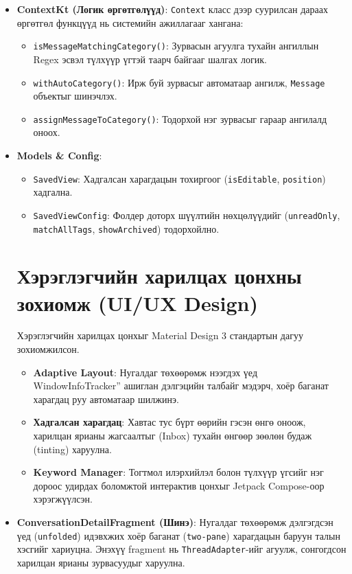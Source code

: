 \begin{itemize}
\begin{itemize}
        \item \textbf{ContextKt (Логик өргөтгөлүүд)}: \texttt{Context} класс дээр суурилсан дараах өргөтгөл функцүүд нь системийн ажиллагааг хангана:
        \begin{itemize}
            \item \texttt{isMessageMatchingCategory()}: Зурвасын агуулга тухайн ангиллын Regex эсвэл түлхүүр үгтэй таарч байгааг шалгах логик.
            \item \texttt{withAutoCategory()}: Ирж буй зурвасыг автоматаар ангилж, \texttt{Message} объектыг шинэчлэх.
            \item \texttt{assignMessageToCategory()}: Тодорхой нэг зурвасыг гараар ангилалд оноох.
        \end{itemize}
    \item \textbf{Models \& Config}:
    \begin{itemize}
        \item \texttt{SavedView}: Хадгалсан харагдацын тохиргоог (\texttt{isEditable}, \texttt{position}) хадгална.
        \item \texttt{SavedViewConfig}: Фолдер доторх шүүлтийн нөхцөлүүдийг (\texttt{unreadOnly}, \texttt{matchAllTags}, \texttt{showArchived}) тодорхойлно.
    \end{itemize}
\section{Хэрэглэгчийн харилцах цонхны зохиомж (UI/UX Design)}
Хэрэглэгчийн харилцах цонхыг Material Design 3 стандартын \cite{material_design} дагуу зохиомжилсон.
\begin{itemize}
    \item \textbf{Adaptive Layout}: Нугалдаг төхөөрөмж нээгдэх үед WindowInfoTracker'' ашиглан дэлгэцийн талбайг мэдэрч, хоёр баганат харагдац руу автоматаар шилжинэ.
    \item \textbf{Хадгалсан харагдац}: Хавтас тус бүрт өөрийн гэсэн өнгө оноож, харилцан ярианы жагсаалтыг (Inbox) тухайн өнгөөр зөөлөн будаж (tinting) харуулна.
    \item \textbf{Keyword Manager}: Тогтмол илэрхийлэл болон түлхүүр үгсийг нэг дороос удирдах боломжтой интерактив цонхыг Jetpack Compose-оор хэрэгжүүлсэн.
\end{itemize}
        \item \textbf{ConversationDetailFragment (Шинэ)}: Нугалдаг төхөөрөмж дэлгэгдсэн үед (\texttt{unfolded}) идэвхжих хоёр баганат (\texttt{two-pane}) харагдацын баруун талын хэсгийг хариуцна. Энэхүү fragment нь \texttt{ThreadAdapter}-ийг агуулж, сонгогдсон харилцан ярианы зурвасуудыг харуулна.


\end{itemize}
\end{itemize}
